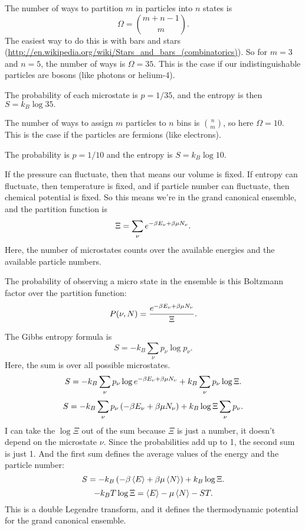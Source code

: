 \documentclass[12pt]{article}
\begin{document}
\hrulefill

 The number of ways to partition $m$ in particles into $n$ states is
\[ \Omega = {m+n-1 \choose m}.\]
The easiest way to do this is with bars and stars (\url{http://en.wikipedia.org/wiki/Stars_and_bars_(combinatorics)}). So for $m=3$ and $n=5$, the number of ways is $\Omega = 35.$ This is the case if our indistinguishable particles are bosons (like photons or helium-4).

 The probability of each microstate is $p=1/35$, and the entropy is then $S = k_B\log 35.$

 The number of ways to assign $m$ particles to $n$ bins is ${n \choose m}$, so here $\Omega = 10.$ This is the case if the particles are fermions (like electrons).

 The probability is $p=1/10$ and the entropy is $S = k_B \log 10$.

\hrulefill

 If the pressure can fluctuate, then that means our volume is fixed. If entropy can fluctuate, then temperature is fixed, and if particle number can fluctuate, then chemical potential is fixed. So this means we're in the grand canonical ensemble, and the partition function is
\[ \Xi = \sum_\nu e^{-\beta E_\nu + \beta \mu N_\nu}.\]
Here, the number of microstates counts over the available energies and the available particle numbers.

 The probability of observing a micro state in the ensemble is this Boltzmann factor over the partition function:
\[ P(\nu, N) = \frac{e^{-\beta E_\nu + \beta \mu N_\nu}}{\Xi}.\]

 The Gibbs entropy formula is
\[ S = -k_B \sum_{\nu} p_\nu \log p_\nu.\]
Here, the sum is over all possible microstates.
\[ S = -k_B \sum_\nu p_\nu \log e^{-\beta E_\nu + \beta \mu N_\nu} + k_B \sum_\nu p_\nu \log \Xi.\]
\[ S = -k_B \sum_\nu p_\nu \left(-\beta E_\nu + \beta \mu N_\nu\right) + k_B\log \Xi \sum_\nu p_\nu.\]
I can take the $\log \Xi$ out of the sum because $\Xi$ is just a number, it doesn't depend on the microstate $\nu$. Since the probabilities add up to 1, the second sum is just 1. And the first sum defines the average values of the energy and the particle number:
\[ S = -k_B\left(-\beta \left \langle E \right \rangle + \beta \mu \left \langle N \right \rangle\right) + k_B\log \Xi.\]
\[ -k_BT \log \Xi = \left \langle E \right \rangle - \mu \left \langle N \right \rangle - ST.\]
This is a double Legendre transform, and it defines the thermodynamic potential for the grand canonical ensemble.
\end{document}
